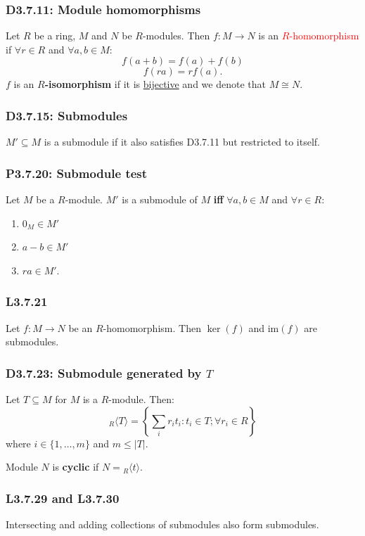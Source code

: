 \documentclass{article}
\begin{document}
\begin{multicols*}{3}
\subsubsection*{D3.7.11: Module homomorphisms}
Let $R$ be a ring, $M$ and $N$ be $R$-modules. Then
$f:M\rightarrow N$ is an \textcolor{red}{$R$-homomorphism}
if $\forall r\in R$ and $\forall a,b\in M$:
$$f(a+b)=f(a)+f(b)$$
$$f(ra)=rf(a).$$
$f$ is an \textbf{$R$-isomorphism} if it is \underline{bijective}
and we denote that $M\cong N$.

\subsubsection*{D3.7.15: Submodules}
$M'\subseteq M$ is a submodule if it also satisfies D3.7.11
but restricted to itself.

\subsubsection*{P3.7.20: Submodule test}
Let $M$ be a $R$-module. $M'$ is a submodule of 
$M$ \textbf{if{}f} $\forall a,b\in M$ and $\forall r\in R$:
\begin{enumerate}
    \item $0_M\in M'$
    \item $a-b\in M'$
    \item $ra\in M'$.
\end{enumerate}

\subsubsection*{L3.7.21}
Let $f:M\rightarrow N$ be an $R$-homomorphism.
Then $\ker(f)$ and $\text{im}(f)$ are submodules.

\subsubsection*{D3.7.23: Submodule generated by $T$}
Let $T\subseteq M$ for $M$ is a $R$-module. Then:
$${}_R\langle T\rangle=\left\{\sum_i r_i t_i:
t_i\in T;\forall r_i\in R\right\}$$
where $i\in\{1,\dots,m\}$ and $m\leq|T|$.

Module $N$ is \textbf{cyclic}
if $N={_R}\langle t\rangle$.

\subsubsection*{L3.7.29 and L3.7.30}
Intersecting and adding collections of submodules
also form submodules.


\end{multicols*}
\end{document}
